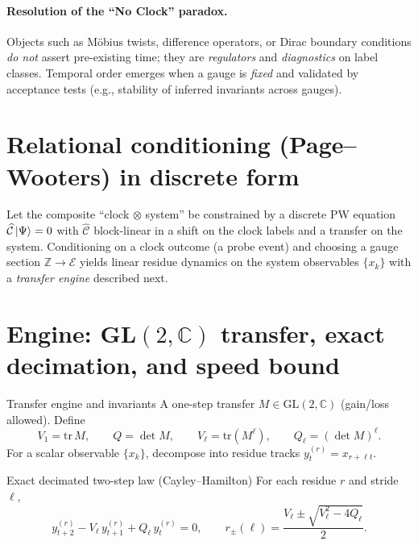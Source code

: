 \documentclass[11pt]{article}
\newcommand{\M}{M}
\newcommand{\V}{V}
\newcommand{\Vl}{V_\ell}
\newcommand{\Q}{Q}
\newcommand{\Qell}{Q_\ell}
\begin{document}
\paragraph{Resolution of the ``No Clock'' paradox.}
Objects such as Möbius twists, difference operators, or Dirac boundary conditions \emph{do not} assert pre-existing time; they are \emph{regulators} and \emph{diagnostics} on label classes. Temporal order emerges when a gauge is \emph{fixed} and validated by acceptance tests (e.g., stability of inferred invariants across gauges).

\section{Relational conditioning (Page--Wooters) in discrete form}
Let the composite ``clock $\otimes$ system'' be constrained by a discrete PW equation $\widehat{\mathcal{C}}\ket{\Psi}=0$ with $\widehat{\mathcal{C}}$ block-linear in a shift on the clock labels and a transfer on the system. Conditioning on a clock outcome (a probe event) and choosing a gauge section $\mathbb{Z}\!\to\!\mathcal{E}$ yields linear residue dynamics on the system observables $\{x_k\}$ with a \emph{transfer engine} described next.

\section{Engine: GL$(2,\mathbb{C})$ transfer, exact decimation, and speed bound}

\begin{mydef}{Transfer engine and invariants}
A one-step transfer $\M\in\mathrm{GL}(2,\mathbb{C})$ (gain/loss allowed). Define
\[
\V_1=\mathrm{tr}\,\M,\qquad \Q=\det\M,\qquad \Vl=\mathrm{tr}(\M^\ell),\qquad \Qell=(\det \M)^\ell.
\]
For a scalar observable $\{x_k\}$, decompose into residue tracks $y^{(r)}_t=x_{r+\ell t}$.
\end{mydef}

\begin{mythm}{Exact decimated two-step law (Cayley--Hamilton)}
For each residue $r$ and stride $\ell$,
\begin{equation}
y^{(r)}_{t+2}-\Vl\,y^{(r)}_{t+1}+\Qell\,y^{(r)}_{t}=0,\qquad
r_\pm(\ell)=\frac{\Vl\pm\sqrt{\Vl^2-4\Qell}}{2}.
\label{eq:engine-law}
\end{equation}
\end{mythm}
\end{document}
